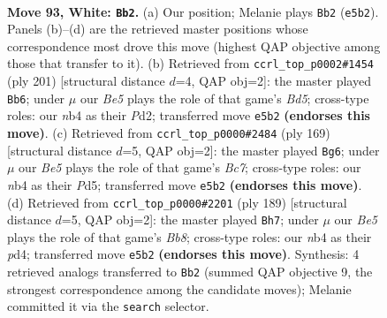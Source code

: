 \documentclass[11pt]{article}
\begin{document}
\clearpage

\begin{figure}[p]\centering
\begin{subfigure}{0.46\textwidth}\centering
\resizebox{\linewidth}{!}{%
\newchessgame
\chessboard[
  setfen={8/8/7k/4B3/1nb5/8/5PK1/8 w - - 31 93},
  showmover=false,
  pgfstyle=straightmove, color=movearrow, markmove={e5-b2}
]}
\caption{}
\end{subfigure}\hfill
\begin{subfigure}{0.46\textwidth}\centering
\resizebox{\linewidth}{!}{%
\newchessgame
\chessboard[
  setfen={8/5K2/7k/6p1/3b4/5B2/3p4/8 b - - 75 101},
  showmover=false,
  pgfstyle=straightmove, color=movearrow, markmove={d4-b6}
]}
\caption{}
\end{subfigure}
\\[4pt]
\begin{subfigure}{0.46\textwidth}\centering
\resizebox{\linewidth}{!}{%
\newchessgame
\chessboard[
  setfen={8/8/1B6/3p4/8/5kp1/2b5/4K3 b - - 3 85},
  showmover=false,
  pgfstyle=straightmove, color=movearrow, markmove={c2-g6}
]}
\caption{}
\end{subfigure}\hfill
\begin{subfigure}{0.46\textwidth}\centering
\resizebox{\linewidth}{!}{%
\newchessgame
\chessboard[
  setfen={8/8/4k3/3p2K1/3P4/8/7B/1b6 b - - 81 95},
  showmover=false,
  pgfstyle=straightmove, color=movearrow, markmove={b1-h7}
]}
\caption{}
\end{subfigure}
\caption{\textbf{Move 93, White: \texttt{Bb2}.} (a) Our position; Melanie plays \texttt{Bb2} (\texttt{e5b2}). Panels (b)--(d) are the retrieved master positions whose correspondence most drove this move (highest QAP objective among those that transfer to it). (b) Retrieved from \texttt{ccrl\_top\_p0002\#1454} (ply 201) [structural distance $d$=4, QAP obj=2]: the master played \texttt{Bb6}; under $\mu$ our \emph{Be5} plays the role of that game's \emph{Bd5}; cross-type roles: our \emph{n}b4 as their \emph{P}d2; transferred move \texttt{e5b2} \textbf{(endorses this move)}. (c) Retrieved from \texttt{ccrl\_top\_p0000\#2484} (ply 169) [structural distance $d$=5, QAP obj=2]: the master played \texttt{Bg6}; under $\mu$ our \emph{Be5} plays the role of that game's \emph{Bc7}; cross-type roles: our \emph{n}b4 as their \emph{P}d5; transferred move \texttt{e5b2} \textbf{(endorses this move)}. (d) Retrieved from \texttt{ccrl\_top\_p0000\#2201} (ply 189) [structural distance $d$=5, QAP obj=2]: the master played \texttt{Bh7}; under $\mu$ our \emph{Be5} plays the role of that game's \emph{Bb8}; cross-type roles: our \emph{n}b4 as their \emph{p}d4; transferred move \texttt{e5b2} \textbf{(endorses this move)}. Synthesis: 4 retrieved analogs transferred to \texttt{Bb2} (summed QAP objective 9, the strongest correspondence among the candidate moves); Melanie committed it via the \texttt{search} selector.}
\label{fig:thought-m184}
\end{figure}
\end{document}
